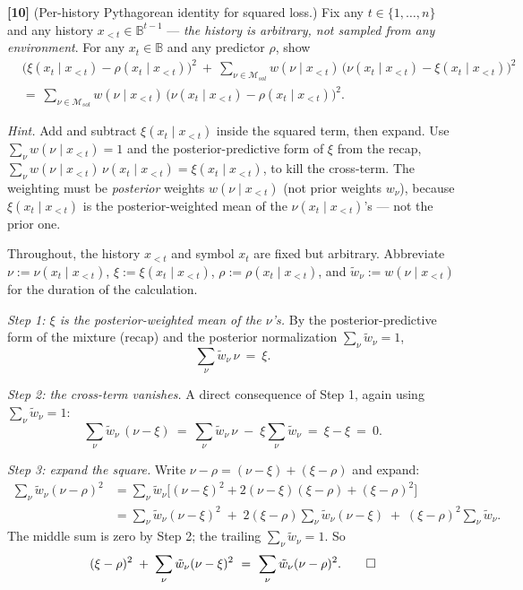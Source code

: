\documentclass[fontsize=11pt, parskip=half]{scrartcl}
\theoremstyle{definition}
\newenvironment{solution}{%
    \begin{tcolorbox}[colback=black!5!white, colframe=black!50!white,
      title={\textbf{Solution}}, fonttitle=\normalfont, breakable]
  }{\end{tcolorbox}}
\newenvironment{solution}{\expandafter\comment}{\expandafter\endcomment}
\newcommand{\Msol}{\mathcal{M}_{sol}}
\begin{document}
\noindent
\textbf{[10]} (Per-history Pythagorean identity for squared loss.) Fix any $t
\in \{1, \dots, n\}$ and any history $x_{<t} \in \mathbb{B}^{t-1}$ ---
\emph{the history is arbitrary, not sampled from any environment}. For any
$x_t \in \mathbb{B}$ and any predictor $\rho$, show
\begin{align*}
  &\bigl(\xi(x_t \mid x_{<t}) - \rho(x_t \mid x_{<t})\bigr)^{2}
  ~+~
  \sum_{\nu \in \Msol} w(\nu \mid x_{<t})\,\bigl(\nu(x_t \mid x_{<t}) - \xi(x_t \mid x_{<t})\bigr)^{2} \\
  &=~
  \sum_{\nu \in \Msol} w(\nu \mid x_{<t})\,\bigl(\nu(x_t \mid x_{<t}) - \rho(x_t \mid x_{<t})\bigr)^{2}.
\end{align*}

\textit{Hint.} Add and subtract $\xi(x_t \mid x_{<t})$ inside the squared term,
then expand. Use $\sum_\nu w(\nu \mid x_{<t}) = 1$ and the posterior-predictive
form of $\xi$ from the recap, $\sum_\nu w(\nu \mid x_{<t})\,\nu(x_t \mid x_{<t})
= \xi(x_t \mid x_{<t})$, to kill the cross-term. The weighting must be
\emph{posterior} weights $w(\nu \mid x_{<t})$ (not prior weights $w_\nu$),
because $\xi(x_t \mid x_{<t})$ is the posterior-weighted mean of the
$\nu(x_t \mid x_{<t})$'s --- not the prior one.

\begin{solution}
Throughout, the history $x_{<t}$ and symbol $x_t$ are fixed but arbitrary.
Abbreviate $\nu := \nu(x_t \mid x_{<t})$, $\xi := \xi(x_t \mid x_{<t})$,
$\rho := \rho(x_t \mid x_{<t})$, and $\tilde w_\nu := w(\nu \mid x_{<t})$ for
the duration of the calculation.

\medskip
\textit{Step 1: $\xi$ is the posterior-weighted mean of the $\nu$'s.}
By the posterior-predictive form of the mixture (recap) and the posterior
normalization $\sum_\nu \tilde w_\nu = 1$,
\[
  \sum_\nu \tilde w_\nu \, \nu ~=~ \xi.
\]

\medskip
\textit{Step 2: the cross-term vanishes.}
A direct consequence of Step 1, again using $\sum_\nu \tilde w_\nu = 1$:
\[
  \sum_\nu \tilde w_\nu \, (\nu - \xi)
  ~=~ \sum_\nu \tilde w_\nu \, \nu \;-\; \xi \sum_\nu \tilde w_\nu
  ~=~ \xi - \xi ~=~ 0.
\]

\medskip
\textit{Step 3: expand the square.}
Write $\nu - \rho = (\nu - \xi) + (\xi - \rho)$ and expand:
\begin{align*}
\sum_\nu \tilde w_\nu (\nu - \rho)^2
  &= \sum_\nu \tilde w_\nu\bigl[(\nu - \xi)^2 + 2(\nu - \xi)(\xi - \rho) + (\xi - \rho)^2\bigr] \\
  &= \sum_\nu \tilde w_\nu (\nu - \xi)^2
     \;+\; 2(\xi - \rho)\sum_\nu \tilde w_\nu (\nu - \xi)
     \;+\; (\xi - \rho)^2 \sum_\nu \tilde w_\nu.
\end{align*}
The middle sum is zero by Step 2; the trailing $\sum_\nu \tilde w_\nu = 1$. So
\[
  (\xi - \rho)^2 \;+\; \sum_\nu \tilde w_\nu (\nu - \xi)^2
  ~=~ \sum_\nu \tilde w_\nu (\nu - \rho)^2. \qedhere
\]
\end{solution}
\end{document}
